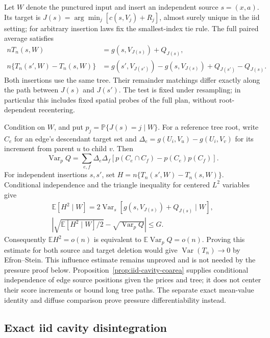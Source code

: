 \documentclass[11pt,reqno]{amsart}
\theoremstyle{definition}
\theoremstyle{remark}
\numberwithin{equation}{section}
\newcommand{\E}{\mathbb E}
\newcommand{\Pp}{\mathbb P}
\begin{document}
Let \(W\) denote the punctured input and insert an independent
source \(s=(x,a)\). Its target is
\(J(s)=\arg\min_j[c(s,V_j)+R_j]\), almost surely unique in the
iid setting; for arbitrary insertion laws fix the smallest-index
tie rule. The full paired average satisfies
\begin{equation}
 \begin{aligned}
 nT_n(s,W)&=g(s,V_{J(s)})+Q_{J(s)},\\
 n\{T_n(s',W)-T_n(s,W)\}
   &=g(s',V_{J(s')})-g(s,V_{J(s)})+Q_{J(s')}-Q_{J(s)}.
 \end{aligned}
 \label{eq:highd-cavity-tree-response}
\end{equation}
Both insertions use the same tree. Their remainder matchings differ
exactly along the path between \(J(s)\) and \(J(s')\).
The test is fixed under resampling; in particular this includes fixed
spatial probes of the full plan, without root-dependent recentering.

Condition on \(W\), and put \(p_j=\Pp\{J(s)=j\mid W\}\).
For a reference tree root, write \(C_e\) for an edge's descendant
target set and \(\Delta_e=g(U_i,V_u)-g(U_i,V_v)\) for its increment
from parent \(u\) to child \(v\). Then
\[
 \operatorname{Var}_p Q=
 \sum_{e,f}\Delta_e\Delta_f
   [p(C_e\cap C_f)-p(C_e)p(C_f)].
\]
For independent insertions \(s,s'\), set
\(H=n\{T_n(s',W)-T_n(s,W)\}\). Conditional independence and the
triangle inequality for centered \(L^2\) variables give
\begin{equation}
 \begin{gathered}
 \E[H^2\mid W]
 =2\operatorname{Var}_s[g(s,V_{J(s)})+Q_{J(s)}\mid W],\\
 \left|\sqrt{\E[H^2\mid W]/2}
        -\sqrt{\operatorname{Var}_p Q}\right|\le G.
 \end{gathered}
 \label{eq:highd-cavity-tree-variance}
\end{equation}
Consequently \(\E H^2=o(n)\) is equivalent to
\(\E\operatorname{Var}_p Q=o(n)\). Proving this estimate for both
source and target deletion would give \(\operatorname{Var}(T_n)\to0\)
by Efron--Stein. This influence estimate remains unproved and is
not needed by the pressure proof below.
Proposition~\ref{prop:iid-cavity-coarea} supplies conditional
independence of edge source positions given the prices and tree; it
does not center their score increments or bound long tree paths.
The separate exact mean-value identity and diffuse comparison prove
pressure differentiability instead.

\subsection{Exact iid cavity disintegration}
\label{subsec:iid-cavity-disintegration}
\end{document}
